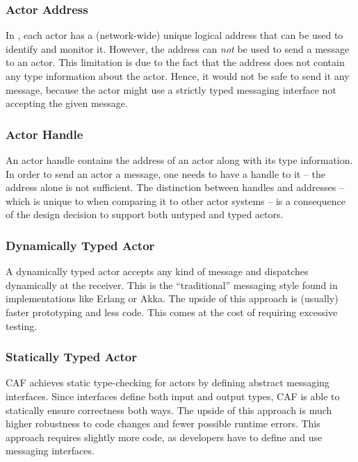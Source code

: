 \subsubsection{Actor Address}

In \lib, each actor has a (network-wide) unique logical address that can be used to identify and monitor it.
However, the address can \emph{not} be used to send a message to an actor.
This limitation is due to the fact that the address does not contain any type information about the actor.
Hence, it would not be safe to send it any message, because the actor might use a strictly typed messaging interface not accepting the given message.

\subsubsection{Actor Handle}

An actor handle contains the address of an actor along with its type information.
In order to send an actor a message, one needs to have a handle to it -- the address alone is not sufficient.
The distinction between handles and addresses -- which is unique to \lib when comparing it to other actor systems -- is a consequence of the design decision to support both untyped and typed actors.

\subsubsection{Dynamically Typed Actor}

A dynamically typed actor accepts any kind of message and dispatches dynamically at the receiver.
This is the ``traditional'' messaging style found in implementations like Erlang or Akka.
The upside of this approach is (usually) faster prototyping and less code.
This comes at the cost of requiring excessive testing.

\subsubsection{Statically Typed Actor}

CAF achieves static type-checking for actors by defining abstract messaging interfaces.
Since interfaces define both input and output types, CAF is able to statically ensure correctness both ways.
The upside of this approach is much higher robustness to code changes and fewer possible runtime errors.
This approach requires slightly more code, as developers have to define and use messaging interfaces.

